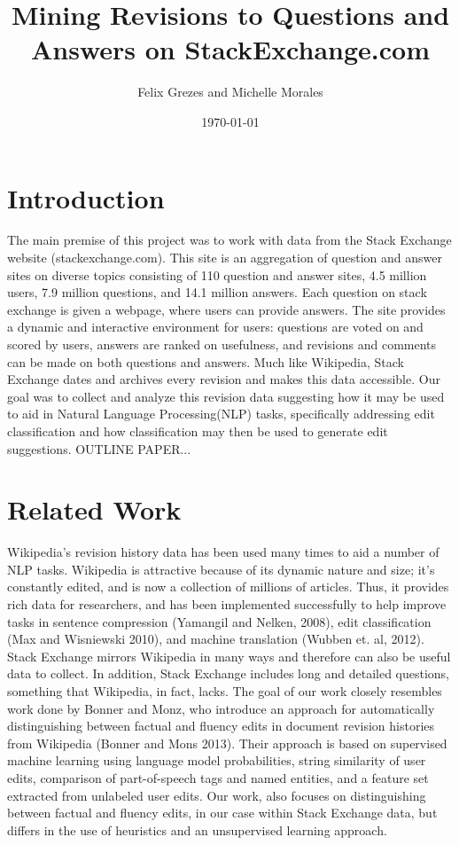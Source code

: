 \documentclass[11pt, oneside]{article}   	%
\title{Mining Revisions to Questions and Answers on StackExchange.com}
\author{Felix Grezes and Michelle Morales}
\date{\today}							%
\begin{document}
\maketitle

\section{Introduction}
The main premise of this project was to work with data from the Stack Exchange website (stackexchange.com). This site is an aggregation of question and answer sites on diverse topics consisting of 110 question and answer sites, 4.5 million users, 7.9 million questions, and 14.1 million answers. Each question on stack exchange is given a webpage, where users can provide answers. The site provides a dynamic and interactive environment for users: questions are voted on and scored by users, answers are ranked on usefulness, and revisions and comments can be made on both questions and answers. Much like Wikipedia, Stack Exchange dates and archives every revision and makes this data accessible. Our goal was to collect and analyze this revision data suggesting how it may be used to aid in Natural Language Processing(NLP) tasks, specifically addressing edit classification and how classification may then be used to generate edit suggestions. OUTLINE PAPER...

\section{Related Work}
Wikipedia's revision history data has been used many times to aid a number of NLP tasks. Wikipedia is attractive because of its dynamic nature and size; it's constantly edited, and is now a collection of millions of articles. Thus, it provides rich data for researchers, and has been implemented successfully to help improve tasks in sentence compression (Yamangil and Nelken, 2008), edit classification (Max and Wisniewski 2010),  and machine translation (Wubben et. al, 2012). Stack Exchange mirrors Wikipedia in many ways and therefore can also be useful data to collect. In addition, Stack Exchange includes long and detailed questions, something that Wikipedia, in fact, lacks. The goal of our work closely resembles work done by Bonner and Monz, who introduce an approach for automatically distinguishing between factual and fluency edits in document revision histories from Wikipedia (Bonner and Mons 2013). Their approach is based on supervised machine learning using language model probabilities, string similarity of user edits, comparison of part-of-speech tags and named entities, and a feature set extracted from unlabeled user edits. Our work, also focuses on distinguishing between factual and fluency edits, in our case within Stack Exchange data, but differs in the use of heuristics and an unsupervised learning approach. 
\end{document}
